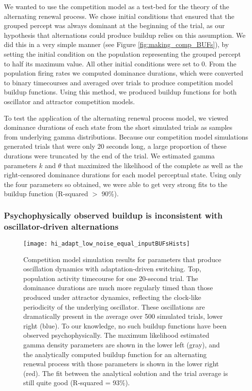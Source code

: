 We wanted to use the competition model as a test-bed for the theory of the alternating renewal process. We chose initial conditions that ensured that the grouped percept was always dominant at the beginning of the trial, as our hypothesis that alternations could produce buildup relies on this assumption. We did this in a very simple manner (see Figure \ref{fig:making_comp_BUFs}), by setting the initial condition on the population representing the grouped percept to half its maximum value. All other initial conditions were set to 0. From the population firing rates we computed dominance durations, which were converted to binary timecourses and averaged over trials to produce competition model buildup functions. Using this method, we produced buildup functions for both oscillator and attractor competition models.

To test the application of the alternating renewal process model, we viewed dominance durations of each state from the short simulated trials as samples from underlying gamma distributions. Because our competition model simulations generated trials that were only 20 seconds long, a large proportion of these durations were truncated by the end of the trial. We estimated gamma parameters $k$ and $\theta$ that maximized the likelihood of the complete as well as the right-censored dominance durations for each model perceptual state. Using only the four parameters so obtained, we were able to get very strong fits to the buildup function (R-squared $>$ 90\%).

\subsubsection{Psychophysically observed buildup is inconsistent with oscillator-driven alternations}

\begin{wrapfigure}{L}{0.5\textwidth}
		\centering
		
		\texttt{[image: hi\_adapt\_low\_noise\_equal\_inputBUFsHists]}
				
		\caption{Competition model simulation results for parameters that produce oscillation dynamics with adaptation-driven switching. Top, population activity timecourse for one 20-second trial. The dominance durations are much more regularly timed than those produced under attractor dynamics, reflecting the clock-like periodicity of the underlying oscillator. These oscillations are dramatically present in the average over 500 simulated trials, lower right (blue). To our knowledge, no such buildup functions have been observed psychophysically. The maximum likelihood estimated gamma density parameters are shown in the lower left (gray), and the analytically computed buildup function for an alternating renewal process with those parameters is shown in the lower right (red). The fit between the analytical solution and the trial average is still quite good (R-squared = 93\%).}
		\label{oscillation_dynamic_buildup}
\end{wrapfigure}


